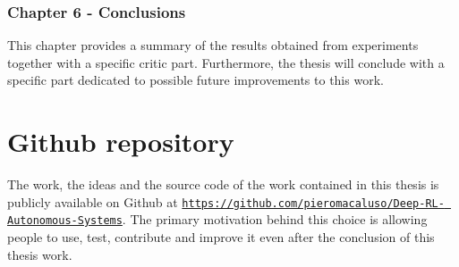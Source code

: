 \subsubsection*{Chapter 6 - Conclusions} 

This chapter provides a summary of the results obtained from experiments together with a specific critic part.
Furthermore, the thesis will conclude with a specific part dedicated to possible future improvements to this work.

\section{Github repository}

The work, the ideas and the source code of the work contained in this thesis is publicly available on Github at \href{https://github.com/pieromacaluso/Deep-RL-Autonomous-Systems}{\texttt{https://github.com/pieromacaluso/Deep-RL- Autonomous-Systems}}. The primary motivation behind this choice is allowing people to use, test, contribute and improve it even after the conclusion of this thesis work.
